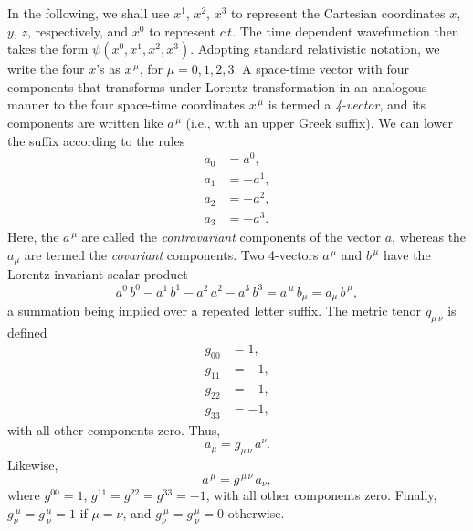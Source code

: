 In the following, we shall use
$x^1$, $x^2$, $x^3$ to represent the Cartesian coordinates  $x$, $y$, $z$, respectively, and $x^0$ to represent $c\,t$. 
The time dependent wavefunction then takes the form $\psi(x^0,x^1,x^2,x^3)$.  Adopting 
standard relativistic notation, we write the four $x$'s as $x^{\,\mu}$, for $\mu= 0,1,2,3$. A space-time
vector with four components that transforms under Lorentz transformation in an analogous manner to the four space-time coordinates 
$x^{\,\mu}$ is termed a {\em 4-vector}, and its components are written like $a^{\,\mu}$ (i.e., with an upper
Greek suffix). We can lower the suffix according to the rules
\begin{align}
a_0&= a^0,\\[0.5ex]
a_1 &=-a^1,\\[0.5ex]
a_2 &= -a^2,\\[0.5ex]
a_3 &= -a^3.
\end{align}
Here, the $a^{\,\mu}$ are called the {\em contravariant}\/ components of the vector $a$, whereas the
$a_{\mu}$ are termed the {\em covariant}\/ components. Two 4-vectors $a^{\,\mu}$ and $b^{\,\mu}$
have the Lorentz invariant scalar product
\begin{equation}\label{e11.5}
a^0\,b^0-a^1\,b^1-a^2\,a^2-a^3\,b^3 = a^{\,\mu}\,b_\mu= a_\mu\,b^{\,\mu},
\end{equation}
a summation being implied over a repeated letter suffix. The metric tenor $g_{\mu\,\nu}$ is defined
\begin{align}
g_{00}&=1,\\[0.5ex]
g_{11}&=-1,\\[0.5ex]
g_{22}&=-1,\\[0.5ex]
g_{33}&=-1,
\end{align}
with all other components zero.
Thus,
\begin{equation}
a_{\mu} = g_{\mu\,\nu}\,a^\nu.
\end{equation}
Likewise,
\begin{equation}
a^{\,\mu} = g^{\,\mu\,\nu}\,a_\nu,
\end{equation}
where $g^{00}=1$, $g^{11}=g^{22}=g^{33}=-1$, with all other components zero. 
Finally, $g_\nu^{~\mu}=g^{\,\mu}_{~\nu} =1$ if $\mu=\nu$, and $g_\nu^{~\mu}=g^{\,\mu}_{~\nu}=0$ otherwise. 


